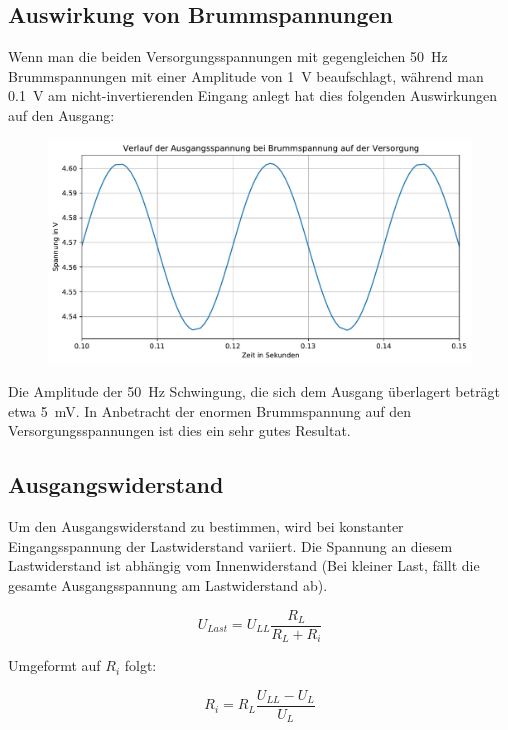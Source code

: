 \subsection{Auswirkung von Brummspannungen}
Wenn man die beiden Versorgungsspannungen mit gegengleichen \SI{50}{\hertz} Brummspannungen mit einer Amplitude von \SI{1}{\volt} beaufschlagt, während man \SI{0.1}{\volt} am nicht-invertierenden Eingang anlegt hat dies folgenden Auswirkungen auf den Ausgang:

\begin{figure}[H]
    \centering
    \includegraphics[width = \textwidth]{tex/5_Differenzverstaerker/pictures/Brumm.pdf}
    \label{fig:my_label}
\end{figure}

Die Amplitude der \SI{50}{\hertz} Schwingung, die sich dem Ausgang überlagert beträgt etwa \SI{5}{\milli \volt}. In Anbetracht der enormen Brummspannung auf den Versorgungsspannungen ist dies ein sehr gutes Resultat.

\subsection{Ausgangswiderstand}

Um den Ausgangswiderstand zu bestimmen, wird bei konstanter Eingangsspannung der Lastwiderstand variiert. Die Spannung an diesem Lastwiderstand ist abhängig vom Innenwiderstand (Bei kleiner Last, fällt die gesamte Ausgangsspannung am Lastwiderstand ab).

\begin{equation}
    U_{Last} = U_{LL} \frac{R_L}{R_L + R_i}
\end{equation}

Umgeformt auf $R_i$ folgt: 

\begin{equation}
    R_i = R_L \frac{U_{LL} - U_L}{U_L}
\end{equation}

